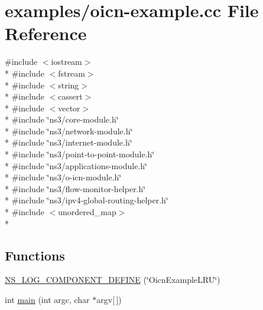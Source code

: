 \hypertarget{oicn-example_8cc}{\section{examples/oicn-\/example.cc File Reference}
\label{oicn-example_8cc}
}
{\ttfamily \#include $<$iostream$>$}\\*
{\ttfamily \#include $<$fstream$>$}\\*
{\ttfamily \#include $<$string$>$}\\*
{\ttfamily \#include $<$cassert$>$}\\*
{\ttfamily \#include $<$vector$>$}\\*
{\ttfamily \#include \char`\"{}ns3/core-\/module.\-h\char`\"{}}\\*
{\ttfamily \#include \char`\"{}ns3/network-\/module.\-h\char`\"{}}\\*
{\ttfamily \#include \char`\"{}ns3/internet-\/module.\-h\char`\"{}}\\*
{\ttfamily \#include \char`\"{}ns3/point-\/to-\/point-\/module.\-h\char`\"{}}\\*
{\ttfamily \#include \char`\"{}ns3/applications-\/module.\-h\char`\"{}}\\*
{\ttfamily \#include \char`\"{}ns3/o-\/icn-\/module.\-h\char`\"{}}\\*
{\ttfamily \#include \char`\"{}ns3/flow-\/monitor-\/helper.\-h\char`\"{}}\\*
{\ttfamily \#include \char`\"{}ns3/ipv4-\/global-\/routing-\/helper.\-h\char`\"{}}\\*
{\ttfamily \#include $<$unordered\-\_\-map$>$}\\*
\subsection*{Functions}
\begin{DoxyCompactItemize}
\item 
\hyperlink{oicn-example_8cc_ab8dc69a49e07cdbdbba15ec392a6f9de}{N\-S\-\_\-\-L\-O\-G\-\_\-\-C\-O\-M\-P\-O\-N\-E\-N\-T\-\_\-\-D\-E\-F\-I\-N\-E} (\char`\"{}Oicn\-Example\-L\-R\-U\char`\"{})
\item 
int \hyperlink{oicn-example_8cc_a0ddf1224851353fc92bfbff6f499fa97}{main} (int argc, char $\ast$argv\mbox{[}$\,$\mbox{]})
\end{DoxyCompactItemize}


